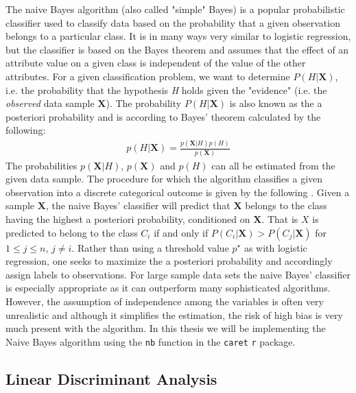 \documentclass[../thesis.tex]{subfiles}
\begin{document}
\noindent The naive Bayes algorithm (also called "simple" Bayes) is a popular probabilistic classifier used to classify data based on the probability that a given observation belongs to a particular class. It is in many ways very similar to logistic regression, but the classifier is based on the Bayes theorem and assumes that the effect of an attribute value on a given class is independent of the value of the other attributes. For a given classification problem, we want to determine $P(H | \boldsymbol{X})$, i.e. the probability that the hypothesis \textit{H} holds given the "evidence" (i.e. the \textit{observed} data sample $\boldsymbol{X}$). The probability $P(H | \boldsymbol{X})$ is also known as the a posteriori probability and is according to Bayes' theorem calculated by the following:
\begin{align}
    p(H | \boldsymbol{X}) = \frac{p(\boldsymbol{X}|H) p(H)}{p(\boldsymbol{X})} 
\end{align}
\noindent The probabilities $p(\boldsymbol{X}|H)$, $p(\boldsymbol{X})$ and $p(H)$ can all be estimated from the given data sample. The procedure for which the algorithm classifies a given observation into a discrete categorical outcome is given by the following \citep{leung2007naive}. Given a sample $\boldsymbol{X}$, the naive Bayes' classifier will predict that $\boldsymbol{X}$ belongs to the class having the highest a posteriori probability, conditioned on $\boldsymbol{X}$. That is $X$ is predicted to belong to the class $C_i$ if and only if $P(C_i| \boldsymbol{X}) > P(C_j | \boldsymbol{X})$ for $1 \leq j \leq n$, $j \neq i$. Rather than using a threshold value $p^\star$ as with logistic regression, one seeks to maximize the a posteriori probability and accordingly assign labels to observations. For large sample data sets the naive Bayes' classifier is especially appropriate as it can outperform many sophisticated algorithms. However, the assumption of independence among the variables is often very unrealistic and although it simplifies the estimation, the risk of high bias is very much present with the algorithm. In this thesis we will be implementing the Naive Bayes algorithm using the \texttt{nb} function in the \texttt{caret}\citep{kuhncaret} \texttt{r} package.

\subsection{Linear Discriminant Analysis}
\label{subsec:lda}
\end{document}
